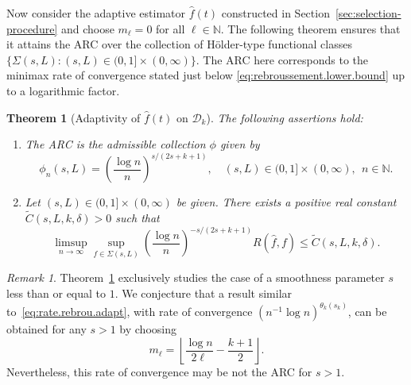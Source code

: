 \documentclass[bj,authoryear]{imsart}
\numberwithin{equation}{section}
\theoremstyle{plain}
\newtheorem{theorem}{Theorem}[section]
\theoremstyle{remark}
\newtheorem{remark}{Remark}
\newcommand{\N}{\mathbb{N}}
\newcommand{\1}{\mathds{1}}
\newcommand{\domain}{\mathcal{D}}
\begin{document}
    Now consider the adaptive estimator $\hat{f}(t)$ constructed in Section~\ref{sec:selection-procedure} and choose $m_{\ell}=0$ for all $\ell\in \N$. The following theorem ensures that it attains the ARC over the collection of H\"older-type functional classes $\{\Sigma(s,L) : (s,L)\in (0,1]\times(0,\infty)\}$. The ARC here corresponds to the minimax rate of convergence stated just below \eqref{eq:rebroussement.lower.bound} up to a logarithmic factor.

    \begin{theorem}[Adaptivity of $\hat{f}(t)$ on \texorpdfstring{$\domain_k$}{D\_k}]\label{thm:adaptivity.polynomial.sectors}
        The following assertions hold:
        \begin{enumerate}
            \item The ARC is the admissible collection $\phi$ given by
                \begin{equation*}
                    \phi_n(s,L) = \left(\frac{\log n}{n}\right)^{s/(2s+k+1)},
                    \quad (s,L)\in (0,1]\times(0,\infty), ~~n\in \N.
                \end{equation*}
            \item
                Let $(s,L)\in (0,1] \times (0,\infty)$ be given.
                There exists a positive real constant $\tilde{C}(s,L,k,\delta) > 0$ such that
                \begin{equation} \label{eq:rate.rebrou.adapt}
                    \limsup_{n\to\infty} \sup_{f\in \Sigma(s,L)} \left(\frac{\log n}{n}\right)^{-s/(2s+k+1)} R(\hat{f}, f)
                    \leq \tilde{C}(s,L,k,\delta).
                \end{equation}
        \end{enumerate}
    \end{theorem}

    \begin{remark}\upshape
        Theorem~\ref{thm:adaptivity.polynomial.sectors} exclusively studies the case of a smoothness parameter $s$ less than or equal to $1$.
        We conjecture that a result similar to~\eqref{eq:rate.rebrou.adapt}, with rate of convergence $(n^{-1} \log n)^{\theta_k(s_k)}$, can be obtained for any $s>1$ by choosing
        \begin{equation*}
            m_\ell = \left\lfloor \frac{\log n}{2\ell}-\frac{k+1}{2}\right\rfloor.
        \end{equation*}
        Nevertheless, this rate of convergence may be not the ARC for $s > 1$.
    \end{remark}
\end{document}
